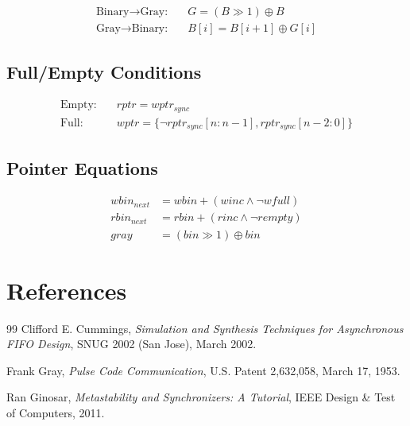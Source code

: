 \documentclass[12pt,a4paper]{article}
\begin{document}
\begin{align}
\text{Binary} \rightarrow \text{Gray:} \quad &G = (B \gg 1) \oplus B \\
\text{Gray} \rightarrow \text{Binary:} \quad &B[i] = B[i+1] \oplus G[i]
\end{align}

\subsection{Full/Empty Conditions}

\begin{align}
\text{Empty:} \quad &rptr = wptr_{sync} \\
\text{Full:} \quad &wptr = \{\neg rptr_{sync}[n:n-1], rptr_{sync}[n-2:0]\}
\end{align}

\subsection{Pointer Equations}

\begin{align}
wbin_{next} &= wbin + (winc \land \neg wfull) \\
rbin_{next} &= rbin + (rinc \land \neg rempty) \\
gray &= (bin \gg 1) \oplus bin
\end{align}

\section{References}

\begin{thebibliography}{99}
Clifford E. Cummings,
\textit{Simulation and Synthesis Techniques for Asynchronous FIFO Design},
SNUG 2002 (San Jose), March 2002.

Frank Gray,
\textit{Pulse Code Communication},
U.S. Patent 2,632,058, March 17, 1953.

Ran Ginosar,
\textit{Metastability and Synchronizers: A Tutorial},
IEEE Design \& Test of Computers, 2011.
\end{thebibliography}
\end{document}
